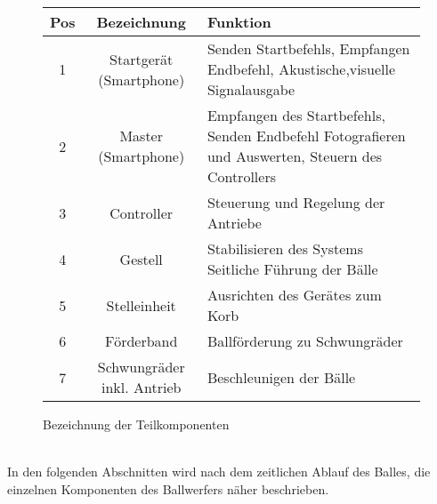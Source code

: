 \begin{figure}[h!]
	\begin{tabular}{|c|c|p{7.5cm}|}
		\hline Pos & Bezeichnung & Funktion \\ 
		\hline 1 & Startgerät (Smartphone) & Senden Startbefehls, Empfangen Endbefehl, Akustische,visuelle Signalausgabe
		\\ 
		\hline 2 & Master  (Smartphone) & Empfangen des Startbefehls, Senden Endbefehl
		Fotografieren und Auswerten, Steuern des Controllers
		\\ 
		\hline 3 & Controller & Steuerung und Regelung der Antriebe \\ 
		\hline 4 & Gestell & Stabilisieren des Systems
		Seitliche Führung der Bälle
		\\ 
		\hline 5 & Stelleinheit & Ausrichten des Gerätes zum Korb \\ 
		\hline 6 & Förderband & Ballförderung zu Schwungräder \\ 
		\hline 7 & Schwungräder inkl. Antrieb & Beschleunigen der Bälle \\ 
		\hline 
	\end{tabular} 
	\centering
	\caption{Bezeichnung der Teilkomponenten}	
	\label{tab:BezTeilkomponenten}
\end{figure}\\
In den folgenden Abschnitten wird nach dem zeitlichen Ablauf des Balles, die einzelnen Komponenten des Ballwerfers näher beschrieben. 